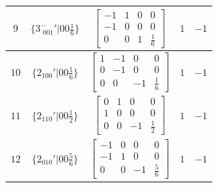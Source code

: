 \documentclass[fleqn,8pt]{jsarticle}
\begin{document}
\begin{longtable}{ccccc}
$ 9 $ & $ \{3^{-}_{\,\,001}{}'|0 0 \frac{1}{6}\} $ & $ \begin{bmatrix} -1 & 1 & 0 & 0 \\ -1 & 0 & 0 & 0 \\ 0 & 0 & 1 & \frac{1}{6} \end{bmatrix} $ & $ 1 $ & $ -1 $ \\ \hline
$ 10 $ & $ \{2{}_{100}{}'|0 0 \frac{1}{6}\} $ & $ \begin{bmatrix} 1 & -1 & 0 & 0 \\ 0 & -1 & 0 & 0 \\ 0 & 0 & -1 & \frac{1}{6} \end{bmatrix} $ & $ 1 $ & $ -1 $ \\ \hline
$ 11 $ & $ \{2{}_{110}{}'|0 0 \frac{1}{2}\} $ & $ \begin{bmatrix} 0 & 1 & 0 & 0 \\ 1 & 0 & 0 & 0 \\ 0 & 0 & -1 & \frac{1}{2} \end{bmatrix} $ & $ 1 $ & $ -1 $ \\ \hline
$ 12 $ & $ \{2{}_{010}{}'|0 0 \frac{5}{6}\} $ & $ \begin{bmatrix} -1 & 0 & 0 & 0 \\ -1 & 1 & 0 & 0 \\ 0 & 0 & -1 & \frac{5}{6} \end{bmatrix} $ & $ 1 $ & $ -1 $ \\
\end{longtable}
\end{document}

